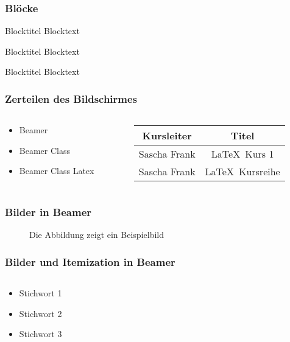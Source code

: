 \documentclass{beamer}
\begin{document}
\begin{frame}\frametitle{Bl\"ocke}

\begin{block}{Blocktitel}
Blocktext 
\end{block}

\begin{exampleblock}{Blocktitel}
Blocktext 
\end{exampleblock}


\begin{alertblock}{Blocktitel}
Blocktext 
\end{alertblock}
\end{frame}


\begin{frame}\frametitle{Zerteilen des Bildschirmes}
\begin{columns}
\begin{column}{5cm}
\begin{itemize}
\item Beamer 
\item Beamer Class 
\item Beamer Class Latex 
\end{itemize}
\end{column}
\begin{column}{5cm}
\begin{tabular}{|c|c|}
\hline
\textbf{Kursleiter} & \textbf{Titel} \\
\hline
Sascha Frank &  \LaTeX \ Kurs 1 \\
\hline
Sascha Frank & \LaTeX \ Kursreihe \\
\hline
\end{tabular}
\end{column}
\end{columns}
\end{frame}

\begin{frame}\frametitle{Bilder in Beamer}
\begin{figure}
\caption{Die Abbildung zeigt ein Beispielbild}
\end{figure}
\end{frame}



\begin{frame}
\frametitle{Bilder und Itemization in Beamer}
\begin{columns}
\begin{column}{5cm}
\begin{itemize}
\item<1-> Stichwort 1
\item<3-> Stichwort 2
\item<5-> Stichwort 3
\end{itemize}
\vspace{3cm} 
\end{column}
\begin{column}{5cm}
\begin{overprint}
\end{overprint}
\end{column}
\end{columns}
\end{frame}
\end{document}
